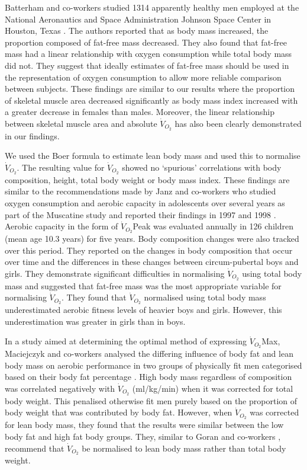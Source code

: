 Batterham and co-workers studied 1314 apparently healthy men employed at the National Aeronautics and Space Administration Johnson Space Center in Houston, Texas \parencite{batterham_modeling_1999}. 
The authors reported that as body mass increased, the proportion composed of fat-free mass decreased. 
They also found that fat-free mass had a linear relationship with oxygen consumption while total body mass did not. 
They suggest that ideally estimates of fat-free mass should be used in the representation of oxygen consumption to allow more reliable comparison between subjects. 
These findings are similar to our results where the proportion of skeletal muscle area decreased significantly as body mass index increased with a greater decrease in females than males. 
Moreover, the linear relationship between skeletal muscle area and absolute $\dot{V}_{O_2}$ has also been clearly demonstrated in our findings. 

We used the Boer formula \parencite{boer_estimated_1984} to estimate lean body mass and used this to normalise $\dot{V}_{O_2}$. 
The resulting value for $\dot{V}_{O_2}$ showed no `spurious' correlations with body composition, height, total body weight or body mass index. 
These findings are similar to the recommendations made by Janz and co-workers who studied oxygen consumption and aerobic capacity in adolescents over several years as part of the Muscatine study and reported their findings in 1997 \parencite{janz_three-year_1997} and 1998 \parencite{janz_longitudinal_1998}. 
Aerobic capacity in the form of $\dot{V}_{O_2}$Peak was evaluated annually in 126 children (mean age 10.3 years) for five years. 
Body composition changes were also tracked over this period. 
They reported on the changes in body composition that occur over time and the differences in these changes between circum-pubertal boys and girls. 
They demonstrate significant difficulties in normalising $\dot{V}_{O_2}$ using total body mass and suggested that fat-free mass was the most appropriate variable for normalising $\dot{V}_{O_2}$. 
They found that $\dot{V}_{O_2}$ normalised using total body mass underestimated aerobic fitness levels of heavier boys and girls. 
However, this underestimation was greater in girls than in boys. 

In a study aimed at determining the optimal method of expressing $\dot{V}_{O_2}$Max, Maciejczyk and co-workers analysed the differing influence of body fat and lean body mass on aerobic performance in two groups of physically fit men categorised based on their body fat percentage \parencite{maciejczyk_influence_2014}. 
High body mass regardless of composition was correlated negatively with $\dot{V}_{O_2}$ (ml/kg/min) when it was corrected for total body weight.
This penalised otherwise fit men purely based on the proportion of body weight that was contributed by body fat. 
However, when $\dot{V}_{O_2}$ was corrected for lean body mass, they found that the results were similar between the low body fat and high fat body groups. 
They, similar to Goran and co-workers \parencite{goran_total_2000}, recommend that $\dot{V}_{O_2}$ be normalised to lean body mass rather than total body weight.

